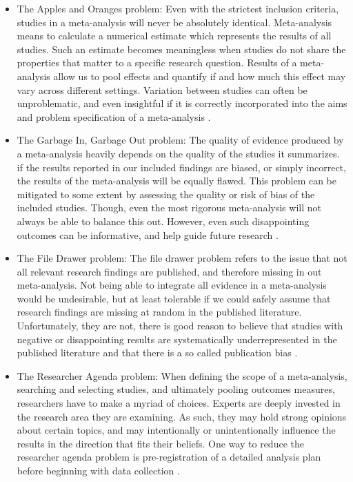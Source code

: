 \documentclass[../../../main.tex]{subfiles}
\begin{document}
\begin{itemize}
\item The Apples and Oranges problem: Even with the strictest inclusion criteria, studies in a meta-analysis will never be absolutely identical. Meta-analysis means to calculate a numerical estimate which represents the results of all studies. Such an estimate becomes meaningless when studies do not share the properties that matter to a specific research question. Results of a meta-analysis allow us to pool effects and quantify if and how much this effect may vary across different settings. Variation between studies can often be unproblematic, and even insightful if it is correctly incorporated into the aims and problem specification of a meta-analysis \autocite{Harrer2021}.

\item The Garbage In, Garbage Out problem: The quality of evidence produced by a meta-analysis heavily depends on the quality of the studies it summarizes. if the results reported in our included findings are biased, or simply incorrect, the results of the meta-analysis will be equally flawed. This problem can be mitigated to some extent by assessing the quality or risk of bias of the included studies. Though, even the most rigorous meta-analysis will not always be able to balance this out. However, even such disappointing outcomes can be informative, and help guide future research \autocite{Harrer2021}.

\item The File Drawer problem: The file drawer problem refers to the issue that not all relevant research findings are published, and therefore missing in out meta-analysis. Not being able to integrate all evidence in a meta-analysis would be undesirable, but at least tolerable if we could safely assume that research findings are missing at random in the published literature. Unfortunately, they are not, there is good reason to believe that studies with negative or disappointing results are systematically underrepresented in the published literature and that there is a so called publication bias \autocite{Harrer2021}.

\item The Researcher Agenda problem: When defining the scope of a meta-analysis, searching and selecting studies, and ultimately pooling outcomes measures, researchers have to make a myriad of choices. Experts are deeply invested in the research area they are examining. As such, they may hold strong opinions about certain topics, and may intentionally or unintentionally influence the results in the direction that fits their beliefs. One way to reduce the researcher agenda problem is pre-registration of a detailed analysis plan before beginning with data collection \autocite{Harrer2021}.
\end{itemize}
\end{document}
